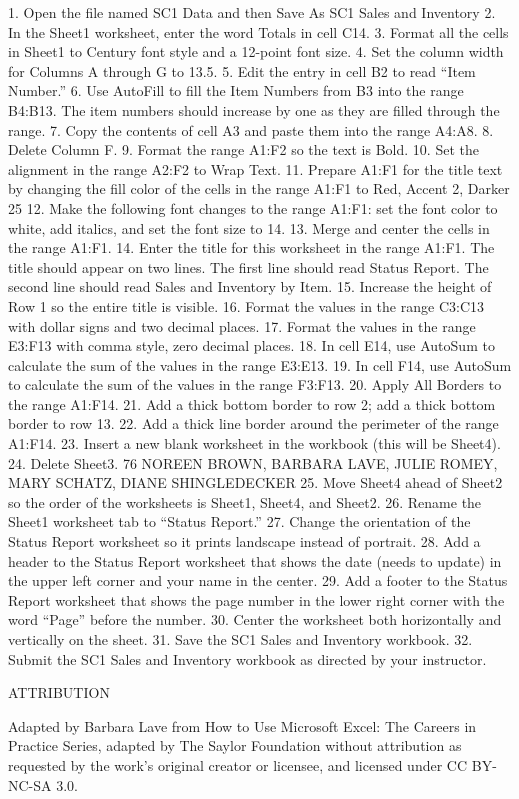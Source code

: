 1.   Open the file named SC1 Data and then Save As SC1 Sales and Inventory
2.   In the Sheet1 worksheet, enter the word Totals in cell C14.
3.   Format all the cells in Sheet1 to Century font style and a 12-point font size.
4.   Set the column width for Columns A through G to 13.5.
5.   Edit the entry in cell B2 to read “Item Number.”
6.   Use AutoFill to fill the Item Numbers from B3 into the range B4:B13. The item numbers should
increase by one as they are filled through the range.
7.   Copy the contents of cell A3 and paste them into the range A4:A8.
8.   Delete Column F.
9.   Format the range A1:F2 so the text is Bold.
10.   Set the alignment in the range A2:F2 to Wrap Text.
11.   Prepare A1:F1 for the title text by changing the fill color of the cells in the range A1:F1 to Red,
Accent 2, Darker 25%
12.   Make the following font changes to the range A1:F1: set the font color to white, add italics, and
set the font size to 14.
13.   Merge and center the cells in the range A1:F1.
14.   Enter the title for this worksheet in the range A1:F1. The title should appear on two lines. The
first line should read Status Report. The second line should read Sales and Inventory by Item.
15.   Increase the height of Row 1 so the entire title is visible.
16.   Format the values in the range C3:C13 with dollar signs and two decimal places.
17.   Format the values in the range E3:F13 with comma style, zero decimal places.
18.   In cell E14, use AutoSum to calculate the sum of the values in the range E3:E13.
19.   In cell F14, use AutoSum to calculate the sum of the values in the range F3:F13.
20.   Apply All Borders to the range A1:F14.
21.   Add a thick bottom border to row 2; add a thick bottom border to row 13.
22.   Add a thick line border around the perimeter of the range A1:F14.
23.   Insert a new blank worksheet in the workbook (this will be Sheet4).
24.   Delete Sheet3.
76 NOREEN BROWN, BARBARA LAVE, JULIE ROMEY, MARY SCHATZ, DIANE SHINGLEDECKER
25.   Move Sheet4 ahead of Sheet2 so the order of the worksheets is Sheet1, Sheet4, and Sheet2.
26.   Rename the Sheet1 worksheet tab to “Status Report.”
27.   Change the orientation of the Status Report worksheet so it prints landscape instead of portrait.
28.   Add a header to the Status Report worksheet that shows the date (needs to update) in the upper
left corner and your name in the center.
29.   Add a footer to the Status Report worksheet that shows the page number in the lower right
corner with the word “Page” before the number.
30.   Center the worksheet both horizontally and vertically on the sheet.
31.   Save the SC1 Sales and Inventory workbook.
32.   Submit the SC1 Sales and Inventory workbook as directed by your instructor.

ATTRIBUTION

Adapted by Barbara Lave from How to Use Microsoft Excel: The Careers in Practice Series, adapted
by The Saylor Foundation without attribution as requested by the work’s original creator or
licensee, and licensed under CC BY-NC-SA 3.0.




